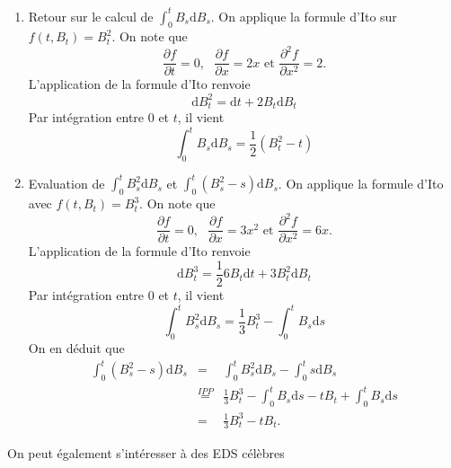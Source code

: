 \begin{ex}
\begin{enumerate}
	\item Retour sur le calcul de $\int_0^tB_s\text{d}B_s$. On applique la formule d'Ito sur $f(t, B_t) = B_t^2$. On note que 
	$$
	\frac{\partial f}{\partial t} = 0,\text{ }\frac{\partial f}{\partial x} = 2x\text{ et }\frac{\partial^2 f}{\partial x^2} = 2.
	$$
	L'application de la formule d'Ito renvoie
	$$
	\text{d}B_t^2 = \text{d}t + 2B_t\text{d}B_t
	$$
	Par intégration entre $0$ et $t$, il vient
	$$
	\int_0^tB_s\text{d}B_s = \frac{1}{2}\left(B_t^2-t\right)
	$$
	\item Evaluation de $\int_0^t B_s^2\text{d}B_s$ et $\int_{0}^t(B_s^2 - s)\text{d}B_s$. On applique la formule d'Ito avec $f(t,B_t) = B_t^3$. On note que 
	$$
	\frac{\partial f}{\partial t} = 0,\text{ }\frac{\partial f}{\partial x} = 3x^2\text{ et }\frac{\partial^2 f}{\partial x^2} = 6x.
	$$
	L'application de la formule d'Ito renvoie
	$$
	\text{d}B_t^3 = \frac{1}{2}6B_t\text{d}t + 3B_t^2\text{d}B_t
	$$
	Par intégration entre $0$ et $t$, il vient
	$$
	\int_0^tB_s^2\text{d}B_s = \frac{1}{3}B_t^3-\int_{0}^tB_s\text{d}s
	$$
	On en déduit que 
	\begin{eqnarray*}
	\int_{0}^t(B_s^2 - s)\text{d}B_s&=&\int_{0}^tB_s^2 \text{d}B_s - \int_{0}^ts\text{d}B_s\\
	&\overset{IPP}{=}&\frac{1}{3}B_t^3-\int_{0}^tB_s\text{d}s - tB_t + \int_{0}^tB_s\text{d}s\\
	&=&\frac{1}{3}B_t^3 - tB_t.
	\end{eqnarray*}
\end{enumerate}
\end{ex}
On peut également s'intéresser à des EDS célèbres
